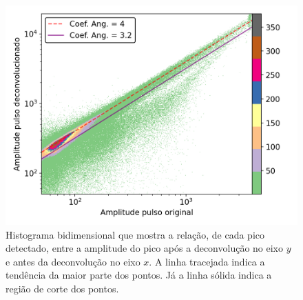 \documentclass[a4paper,12pt,oneside]{book}
\begin{document}
\begin{figure}[H]
    \centering
    \includegraphics[scale = 0.85]{figs/corr_pulso_deconv.png}
    \caption{Histograma bidimensional que mostra a relação, de cada pico detectado, entre a amplitude do pico após a deconvolução no eixo $y$ e antes da deconvolução no eixo $x$. A linha tracejada indica a tendência da maior parte dos pontos. Já a linha sólida indica a região de corte dos pontos.}
    \label{fig:corr_amps}
\end{figure}




\end{document}
